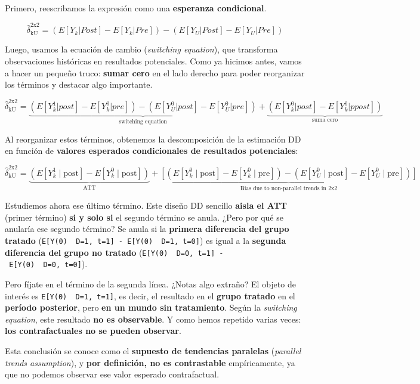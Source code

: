 \documentclass[
  letterpaper,
  DIV=11,
  numbers=noendperiod,
  oneside]{scrreprt}
\begin{document}
Primero, reescribamos la expresión como una \textbf{esperanza
condicional}.

\[
\hat{\delta}^{\text{2x2}}_{\text{kU}} = (E[Y_k|Post] - E[Y_k|Pre]) - (E[Y_U|Post] - E[Y_U|Pre])
\]

Luego, usamos la ecuación de cambio (\emph{switching equation}), que
transforma observaciones históricas en resultados potenciales. Como ya
hicimos antes, vamos a hacer un pequeño truco: \textbf{sumar cero} en el
lado derecho para poder reorganizar los términos y destacar algo
importante.

\[
\hat{\delta}^{\text{2x2}}_{\text{kU}} = \underbrace{(E[Y^1_k|post] -E[Y^0_k|pre])-(E[Y^0_U|post] -E[Y^0_U|pre])}_{\text{switching equation}} + \underbrace{(E[Y^0_k|post] -E[Y^0_k|ppost])}_{\text{suma cero}}
\]

Al reorganizar estos términos, obtenemos la descomposición de la
estimación DD en función de \textbf{valores esperados condicionales de
resultados potenciales}:

\[
\hat{\delta}^{\text{2x2}}_{\text{kU}} = 
\underbrace{\left( E[Y^1_k \mid \text{post}] - E[Y^0_k \mid \text{post}] \right)}_{\text{ATT}} + 
\underbrace{\left[ \left( E[Y^0_k \mid \text{post}] - E[Y^0_k \mid \text{pre}] \right) - \left( E[Y^0_U \mid \text{post}] - E[Y^0_U \mid \text{pre}] \right) \right]}_{\text{Bias due to non-parallel trends in 2x2}}
\]

Estudiemos ahora ese último término. Este diseño DD sencillo
\textbf{aisla el ATT} (primer término) \textbf{si y solo si} el segundo
término se anula. ¿Pero por qué se anularía ese segundo término? Se
anula si la \textbf{primera diferencia del grupo tratado}
(\texttt{E{[}Y(0)\ \textbar{}\ D=1,\ t=1{]}\ -\ E{[}Y(0)\ \textbar{}\ D=1,\ t=0{]}})
es igual a la \textbf{segunda diferencia del grupo no tratado}
(\texttt{E{[}Y(0)\ \textbar{}\ D=0,\ t=1{]}\ -\ E{[}Y(0)\ \textbar{}\ D=0,\ t=0{]}}).

Pero fíjate en el término de la segunda línea. ¿Notas algo extraño? El
objeto de interés es \texttt{E{[}Y(0)\ \textbar{}\ D=1,\ t=1{]}}, es
decir, el resultado en el \textbf{grupo tratado} en el \textbf{período
posterior}, pero \textbf{en un mundo sin tratamiento}. Según la
\emph{switching equation}, este resultado \textbf{no es observable}. Y
como hemos repetido varias veces: \textbf{los contrafactuales no se
pueden observar}.

Esta conclusión se conoce como el \textbf{supuesto de tendencias
paralelas} (\emph{parallel trends assumption}), y \textbf{por
definición, no es contrastable} empíricamente, ya que no podemos
observar ese valor esperado contrafactual.
\end{document}
